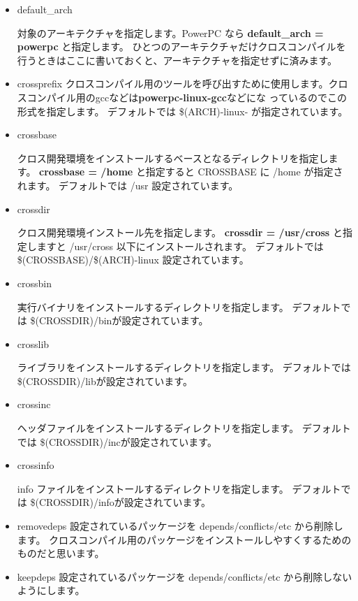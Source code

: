 \documentclass[mingoth,a4paper]{jsarticle}
\begin{document}
\begin{itemize}
\item default\_arch

	対象のアーキテクチャを指定します。PowerPC なら {\bf default\_arch = powerpc }と指定します。
	ひとつのアーキテクチャだけクロスコンパイルを行うときはここに書いておくと、アーキテクチャを指定せずに済みます。
	
\item crossprefix
	クロスコンパイル用のツールを呼び出すために使用します。クロスコンパイル用のgccなどは{\bf powerpc-linux-gcc}などにな
	っているのでこの形式を指定します。
	デフォルトでは \$(ARCH)-linux- が指定されています。

\item crossbase

	クロス開発環境をインストールするベースとなるディレクトリを指定します。
	{\bf crossbase = /home }と指定すると CROSSBASE に /home が指定されます。
	デフォルトでは /usr 設定されています。
	
\item crossdir 

	クロス開発環境インストール先を指定します。
	{\bf crossdir = /usr/cross }と指定しますと /usr/cross 以下にインストールされます。
	デフォルトでは \$(CROSSBASE)/\$(ARCH)-linux 設定されています。
	
\item crossbin

	実行バイナリをインストールするディレクトリを指定します。
	デフォルトでは \$(CROSSDIR)/binが設定されています。
	
\item crosslib

	ライブラリをインストールするディレクトリを指定します。
	デフォルトでは \$(CROSSDIR)/libが設定されています。
	
\item crossinc

	ヘッダファイルをインストールするディレクトリを指定します。
	デフォルトでは \$(CROSSDIR)/incが設定されています。
	
\item crossinfo

	info ファイルをインストールするディレクトリを指定します。
	デフォルトでは \$(CROSSDIR)/infoが設定されています。
	
\item removedeps
	設定されているパッケージを depends/conflicts/etc から削除します。
	クロスコンパイル用のパッケージをインストールしやすくするためのものだと思います。
	
\item keepdeps
	設定されているパッケージを depends/conflicts/etc から削除しないようにします。

\end{itemize}
\end{document}

